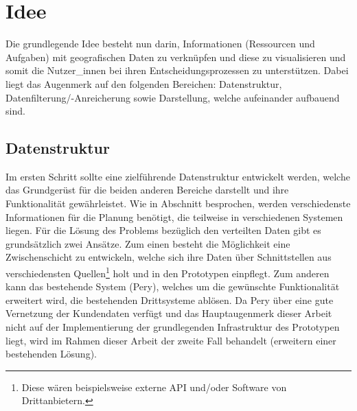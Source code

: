 \documentclass[Bachelorarbeit.tex]{subfiles}
\begin{document}
\begin{comment}
Als Grundlage für den Prototypen dient die Software Pery der Firma Perfany GmbH. 
Dabei handelt es sich um 
Wobei der Fokus auf dem Ticket Modul der Software ruht. Dabei ist das Anwendungskonzept des Moduls so ausgelegt das sämtliche Aufgaben, die die Firma betreffen , einzeln als Tickets erfasst werden. 
\end{comment}

\section{Idee}
\label{chap:einfuehrung:sec:idee}

Die grundlegende Idee besteht nun darin, Informationen (Ressourcen und Aufgaben) mit geografischen Daten zu verknüpfen und diese zu visualisieren und somit die Nutzer\_innen bei ihren Entscheidungsprozessen zu unterstützen. 
Dabei liegt das Augenmerk auf den folgenden Bereichen: Datenstruktur, Datenfilterung/-Anreicherung sowie Darstellung, welche aufeinander aufbauend sind. 


\subsection*{Datenstruktur}
Im ersten Schritt sollte eine zielführende Datenstruktur entwickelt werden, welche das Grundgerüst für die beiden anderen Bereiche darstellt und ihre Funktionalität gewährleistet.
Wie in Abschnitt  besprochen, werden verschiedenste Informationen für die Planung benötigt, die teilweise in verschiedenen Systemen liegen. 
Für die Lösung des Problems bezüglich den verteilten Daten gibt es grundsätzlich zwei Ansätze.
Zum einen besteht die Möglichkeit eine Zwischenschicht zu entwickeln, welche sich ihre Daten über Schnittstellen aus verschiedensten Quellen\footnote{Diese wären beispielsweise externe \ac{API} und/oder Software von Drittanbietern.} holt und in den Prototypen einpflegt.
Zum anderen kann das bestehende System (Pery), welches um die gewünschte Funktionalität erweitert wird, die bestehenden Drittsysteme ablösen. 
Da Pery über eine gute Vernetzung der Kundendaten verfügt und das Hauptaugenmerk dieser Arbeit nicht auf der Implementierung der grundlegenden Infrastruktur des Prototypen liegt, wird im Rahmen dieser Arbeit der zweite Fall behandelt (erweitern einer bestehenden Lösung).
\end{document}

